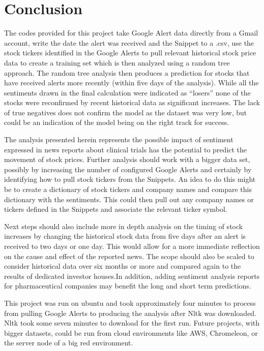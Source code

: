 \documentclass[sigconf]{acmart}
\begin{document}
\section{Conclusion}
The codes provided for this project take Google Alert data directly from a Gmail account, write the date the alert was received and the Snippet to a .csv, use the stock tickers identified in the Google Alerts to pull relevant historical stock price data to create a training set which is then analyzed using a random tree approach. The random tree analysis then produces a prediction for stocks that have received alerts more recently (within five days of the analysis). While all the sentiments drawn in the final calculation were indicated as ``losers'' none of the stocks were reconfirmed by recent historical data as significant increases. The lack of true negatives does not confirm the model as the dataset was very low, but could be an indication of the model being on the right track for success.

The analysis presented herein represents the possible impact of sentiment expressed in news reports about clinical trials has the potential to predict the movement of stock prices. Further analysis should work with a bigger data set, possibly by increasing the number of configured Google Alerts and certainly by identifying how to pull stock tickers from the Snippets. An idea to do this might be to create a dictionary of stock tickers and company names and compare this dictionary with the sentiments. This could then pull out any company names or tickers defined in the Snippets and associate the relevant ticker symbol. 

Next steps should also include more in depth analysis on the timing of stock increases by changing the historical stock data from five days after an alert is received to two days or one day. This would allow for a more immediate reflection on the cause and effect of the reported news. The scope should also be scaled to consider historical data over six months or more and compared again to the results of dedicated investor houses.In addition, adding sentiment analysis reports for pharmaceutical companies may benefit the long and short term predictions.

This project was run on ubuntu and took approximately four minutes to process from pulling Google Alerts to producing the analysis after Nltk was downloaded. Nltk took some seven minutes to download for the first run. Future projects, with bigger datasets, could be run from cloud environments like AWS, Chromeleon, or the server node of a big red environment. 
\end{document}
